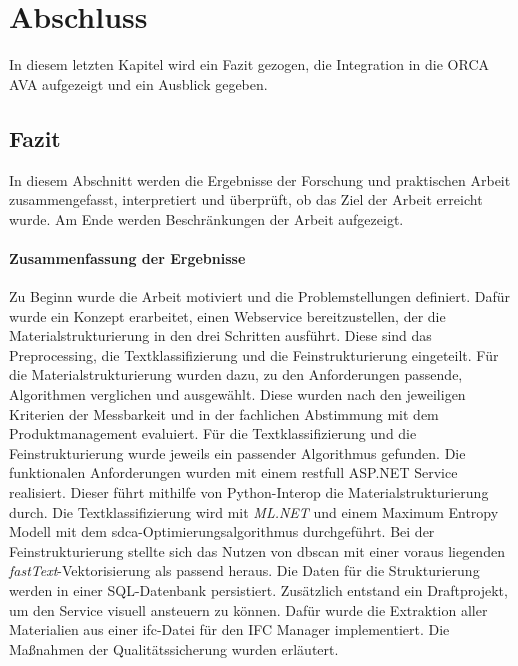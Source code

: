 \chapter{Abschluss}
\label{c:closing}
In diesem letzten Kapitel wird ein Fazit gezogen, die Integration in die ORCA AVA aufgezeigt und ein Ausblick gegeben.

\section{Fazit}
\label{c:closing:conclusion}
In diesem Abschnitt werden die Ergebnisse der Forschung und praktischen Arbeit zusammengefasst, interpretiert und überprüft, ob das Ziel der Arbeit erreicht wurde. Am Ende werden Beschränkungen der Arbeit aufgezeigt.

\subsubsection{Zusammenfassung der Ergebnisse}
Zu Beginn wurde die Arbeit motiviert und die Problemstellungen definiert. Dafür wurde ein Konzept erarbeitet, einen Webservice bereitzustellen, der die Materialstrukturierung in den drei Schritten ausführt. Diese sind das Preprocessing, die Textklassifizierung und die Feinstrukturierung eingeteilt. Für die Materialstrukturierung wurden dazu, zu den Anforderungen passende, Algorithmen verglichen und ausgewählt. Diese wurden nach den jeweiligen Kriterien der Messbarkeit und in der fachlichen Abstimmung mit dem Produktmanagement evaluiert. Für die Textklassifizierung und die Feinstrukturierung wurde jeweils ein passender Algorithmus gefunden. Die funktionalen Anforderungen wurden mit einem \ac{rest}full ASP.NET Service realisiert. Dieser führt mithilfe von Python-Interop die Materialstrukturierung durch. Die Textklassifizierung wird mit \textit{ML.NET} und einem Maximum Entropy Modell mit dem \ac{sdca}-Optimierungsalgorithmus durchgeführt. Bei der Feinstrukturierung stellte sich das Nutzen von \ac{dbscan} mit einer voraus liegenden \textit{fastText}-Vektorisierung als passend heraus. Die Daten für die Strukturierung werden in einer SQL-Datenbank persistiert. Zusätzlich entstand ein Draftprojekt, um den Service visuell ansteuern zu können. Dafür wurde die Extraktion aller Materialien aus einer \ac{ifc}-Datei für den IFC Manager implementiert. Die Maßnahmen der Qualitätssicherung wurden erläutert.

